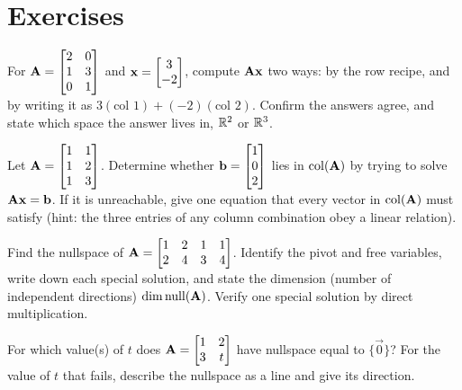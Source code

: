 \section{Exercises}

\begin{exercise}\label{ch12:ex-combo}
For $\mathbf{A}=\begin{bmatrix}2 & 0\\1 & 3\\0 & 1\end{bmatrix}$ and
$\mathbf{x}=\begin{bmatrix}3\\-2\end{bmatrix}$, compute $\mathbf{A}\mathbf{x}$ two ways: by the row recipe,
and by writing it as $3(\text{col }1) + (-2)(\text{col }2)$. Confirm the answers
agree, and state which space the answer lives in, $\mathbb{R}^2$ or $\mathbb{R}^3$.
\end{exercise}

\begin{exercise}\label{ch12:ex-reachable}
Let $\mathbf{A}=\begin{bmatrix}1 & 1\\1 & 2\\1 & 3\end{bmatrix}$. Determine whether
$\mathbf{b}=\begin{bmatrix}1\\0\\2\end{bmatrix}$ lies in $\operatorname{col}(\mathbf{A})$ by trying to solve
$\mathbf{A}\mathbf{x}=\mathbf{b}$. If it is unreachable, give one equation that every
vector in $\operatorname{col}(\mathbf{A})$ must satisfy (hint: the three entries of any column
combination obey a linear relation).
\end{exercise}

\begin{exercise}\label{ch12:ex-null}
Find the nullspace of
$\mathbf{A}=\begin{bmatrix}1 & 2 & 1 & 1\\2 & 4 & 3 & 4\end{bmatrix}$.
Identify the pivot and free variables, write down each special solution, and
state the dimension (number of independent directions) $\dim\operatorname{null}(\mathbf{A})$. Verify one special solution by direct multiplication.
\end{exercise}

\begin{exercise}\label{ch12:ex-trivial}
For which value(s) of $t$ does $\mathbf{A}=\begin{bmatrix}1 & 2\\3 & t\end{bmatrix}$
have nullspace equal to $\{\vec 0\}$? For the value of $t$ that fails, describe
the nullspace as a line and give its direction.
\end{exercise}


